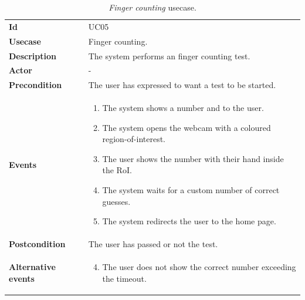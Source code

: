 \begin{table}[h!t]
    \centering
    \caption{\emph{Finger counting} usecase.}
    \label{tab:uc:finger}
    \centering
    \begin{tabular}{l | p{80mm}}
        \textbf{Id}                 & UC05                                                 \\
        \textbf{Usecase}            & Finger counting.                                     \\
        \textbf{Description}        & The system performs an finger counting test.         \\
        \textbf{Actor}              & -                                                    \\
        \textbf{Precondition}       & The user has expressed to want a test to be started. \\
        \textbf{Events}             & \begin{enumerate}
            \item The system shows a number and to the user.
            \item The system opens the webcam with a coloured region-of-interest.
            \item The user shows the number with their hand inside the RoI.
            \item The system waits for a custom number of correct guesses.
            \item The system redirects the user to the home page.
        \end{enumerate}                           \\
        \textbf{Postcondition}      & The user has passed or not the test.                 \\
        \textbf{Alternative events} & \begin{enumerate}
            \setcounter{enumi}{3}
            \item The user does not show the correct number exceeding the timeout.
        \end{enumerate}
    \end{tabular}
\end{table}

